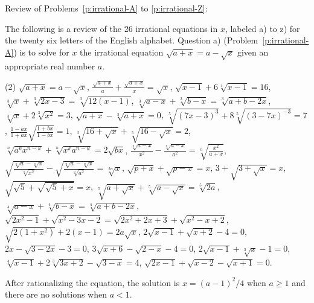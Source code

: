 \begin{tcolorbox}[title={Review of Irrational Equations A--Z}]
Review of Problems~\ref{p:irrational-A} to \ref{p:irrational-Z}:
\begin{question}[name={Irrational Equations Collection}]\label{p:irrational-A}
    The following is a review of the 26 irrational equations in $x$, labeled a) to z) for the twenty six letters of the English alphabet. Question a) (Problem~\ref{p:irrational-A}) is to solve for $x$ the irrational equation $\sqrt{a+x} = a - \sqrt{x}$ given an appropriate real number $a$.
    \begin{tasks}(2)
        \task $\sqrt{a+x} = a - \sqrt{x}$,
        \task $\displaystyle \frac{\sqrt{a+x}}{a}+\frac{\sqrt{a+x}}{x}=\sqrt x$,
        \task $\sqrt{x-1}+6\sqrt[4]{x-1}=16$,
        \task $\sqrt[3]{x}+\sqrt[3]{2x-3}=\sqrt[3]{12(x-1)}$,
        \task $\sqrt[3]{a-x}+\sqrt[3]{b-x}=\sqrt[3]{a+b-2x}$,
        \task $\sqrt[3]{x}+2\sqrt[3]{x^2}=3$,
        \task $\sqrt{a+x}-\sqrt[3]{a+x}=0$,
        \task $\sqrt[5]{(7x-3)^3}+8\sqrt[5]{(3-7x)^{-3}}=7$,
        \task $\displaystyle \frac{1-ax}{1+ax}\sqrt{\frac{1+bx}{1-bx}}=1$,
        \task $\sqrt[5]{16+\sqrt{x}}+\sqrt[5]{16-\sqrt{x}}=2$,
        \task $\sqrt[n]{a^kx^{n-k}}+\sqrt[n]{x^ka^{n-k}}=2\sqrt{bx}$,
        \task $\displaystyle \frac{\sqrt[n]{a-x}}{x^2}-\frac{\sqrt[n]{a-x}}{a^2}=\sqrt[n]{\frac{x^2}{a+x}}$,
        \task $\displaystyle \sqrt{\frac{\sqrt[n]{a}-\sqrt[n]{x}}{\sqrt[n]{x^2}}}-\sqrt{\frac{\sqrt[n]{a}-\sqrt[n]{x}}{\sqrt[n]{a^2}}}=\sqrt[2n]{x}$,
        \task $\sqrt{p+x}+\sqrt{p-x}=x$,
        \task $3+\sqrt{3+\sqrt{x}}=x$,
        \task $\sqrt{\sqrt{5}+\sqrt{\sqrt{5}+x}}=x$,
        \task $\sqrt[5]{a+\sqrt{x}}+\sqrt[5]{a-\sqrt{x}}=\sqrt[5]{2a}$,
        \task $\sqrt[4]{a-x}+\sqrt[4]{b-x}=\sqrt[4]{a+b-2x}$,
        \task $\sqrt{2x^2-1}+\sqrt{x^2-3x-2} = \sqrt{2x^2+2x+3}+\sqrt{x^2-x+2}$,
        \task $\sqrt{2(1+x^2)}+2(x-1)=2a\sqrt{x}$,
        \task $2\sqrt{x-1}+\sqrt{x+2}-4=0$,
        \task $2x-\sqrt{3-2x}-3=0$,
        \task $3\sqrt{x+6}-\sqrt{2-x}-4=0$,
        \task $2\sqrt{x-1}+\sqrt[3]{x}-1=0$,
        \task $\sqrt[4]{x-1}+2\sqrt[3]{3x+2}-\sqrt{3-x}=4$,
        \task $\sqrt{2x-1}+\sqrt{x-2}-\sqrt{x+1}=0$.
    \end{tasks}
\end{question}
\end{tcolorbox}

\begin{solution}
    After rationalizing the equation, the solution is $x=(a-1)^2/4$ when $a \geq 1$ and there are no solutions when $a<1$.
\end{solution}


